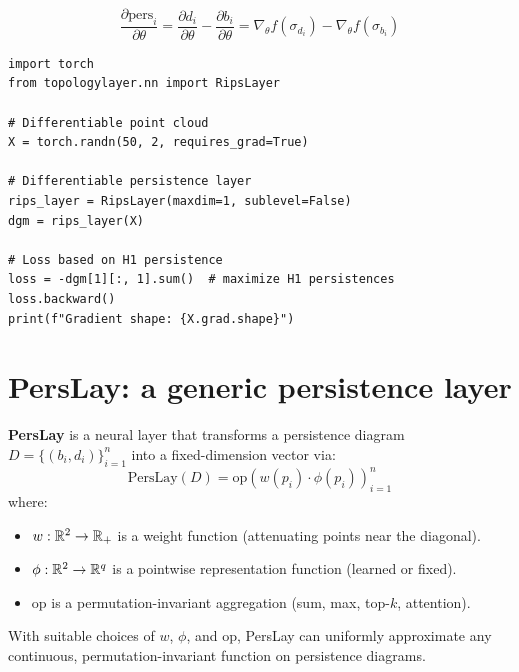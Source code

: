 \begin{keyformulas}[title=\textbf{Persistence gradient}]
\[
  \frac{\partial \mathrm{pers}_i}{\partial \theta}
  = \frac{\partial d_i}{\partial \theta}
  - \frac{\partial b_i}{\partial \theta}
  = \nabla_\theta f(\sigma_{d_i}) - \nabla_\theta f(\sigma_{b_i})
\]
\end{keyformulas}

\begin{verbatim}
import torch
from topologylayer.nn import RipsLayer

# Differentiable point cloud
X = torch.randn(50, 2, requires_grad=True)

# Differentiable persistence layer
rips_layer = RipsLayer(maxdim=1, sublevel=False)
dgm = rips_layer(X)

# Loss based on H1 persistence
loss = -dgm[1][:, 1].sum()  # maximize H1 persistences
loss.backward()
print(f"Gradient shape: {X.grad.shape}")
\end{verbatim}

\section{PersLay: a generic persistence layer}
\label{sec:perslay}

\begin{definition}
\textbf{PersLay} is a neural layer that transforms a persistence
diagram $D = \{(b_i, d_i)\}_{i=1}^n$ into a fixed-dimension vector
via:
\[
  \mathrm{PersLay}(D) = \mathrm{op}\!\left(
  w(p_i) \cdot \phi(p_i)\right)_{i=1}^n
\]
where:
\begin{itemize}
  \item $w : \mathbb{R}^2 \to \mathbb{R}_+$ is a weight function (attenuating
        points near the diagonal).
  \item $\phi : \mathbb{R}^2 \to \mathbb{R}^q$ is a pointwise representation
        function (learned or fixed).
  \item $\mathrm{op}$ is a permutation-invariant aggregation
        (sum, max, top-$k$, attention).
\end{itemize}
\end{definition}

\begin{proposition}
With suitable choices of $w$, $\phi$, and $\mathrm{op}$, PersLay
can uniformly approximate any continuous, permutation-invariant
function on persistence diagrams.
\end{proposition}

